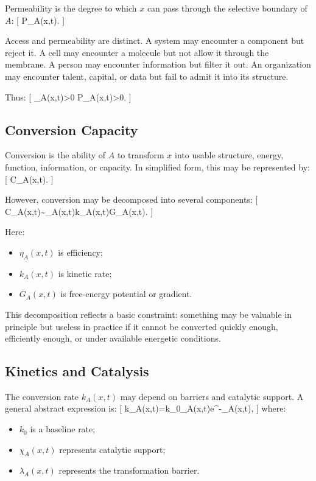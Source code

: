 \documentclass[11pt,a4paper]{article}
\begin{document}
Permeability is the degree to which $x$ can pass through the selective boundary of $A$:
[
P_A(x,t).
]

Access and permeability are distinct. A system may encounter a component but reject it. A cell may encounter a molecule but not allow it through the membrane. A person may encounter information but filter it out. An organization may encounter talent, capital, or data but fail to admit it into its structure.

Thus:
[
\alpha_A(x,t)>0 \nRightarrow P_A(x,t)>0.
]

\subsection{Conversion Capacity}

Conversion is the ability of $A$ to transform $x$ into usable structure, energy, function, information, or capacity. In simplified form, this may be represented by:
[
C_A(x,t).
]

However, conversion may be decomposed into several components:
[
C_A(x,t)\sim \eta_A(x,t)k_A(x,t)G_A(x,t).
]

Here:
\begin{itemize}[leftmargin=2em]
\item $\eta_A(x,t)$ is efficiency;
\item $k_A(x,t)$ is kinetic rate;
\item $G_A(x,t)$ is free-energy potential or gradient.
\end{itemize}

This decomposition reflects a basic constraint: something may be valuable in principle but useless in practice if it cannot be converted quickly enough, efficiently enough, or under available energetic conditions.

\subsection{Kinetics and Catalysis}

The conversion rate $k_A(x,t)$ may depend on barriers and catalytic support. A general abstract expression is:
[
k_A(x,t)=k_0\cdot \chi_A(x,t)\cdot e^{-\lambda_A(x,t)},
]
where:
\begin{itemize}[leftmargin=2em]
\item $k_0$ is a baseline rate;
\item $\chi_A(x,t)$ represents catalytic support;
\item $\lambda_A(x,t)$ represents the transformation barrier.
\end{itemize}
\end{document}
